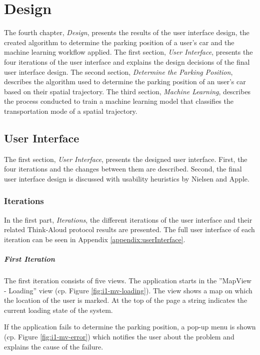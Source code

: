 \chapter{Design}
The fourth chapter, \textit{Design}, presents the results of the user interface design, the created algorithm to determine the parking position of a user's car and the machine learning workflow applied. The first section, \textit{User Interface}, presents the four iterations of the user interface and explains the design decisions of the final user interface design. The second section, \textit{Determine the Parking Position}, describes the algorithm used to determine the parking position of an user's car based on their spatial trajectory. The third section, \textit{Machine Learning}, describes the process conducted to train a machine learning model that classifies the transportation mode of a spatial trajectory.

\section{User Interface}
The first section, \textit{User Interface}, presents the designed user interface. First, the four iterations and the changes between them are described. Second, the final user interface design is discussed with usability heuristics by Nielsen and Apple.

\subsection{Iterations}
In the first part, \textit{Iterations}, the different iterations of the user interface and their related Think-Aloud protocol results are presented. The full user interface of each iteration can be seen in Appendix \ref{appendix:userInterface}.

\paragraph{First Iteration}

The first iteration consists of five views. The application starts in the ''MapView - Loading'' view (cp. Figure \ref{fig:i1-mv-loading}). The view shows a map on which the location of the user is marked. At the top of the page a string indicates the current loading state of the system.

If the application fails to determine the parking position, a pop-up menu is shown (cp. Figure \ref{fig:i1-mv-error}) which notifies the user about the problem and explains the cause of the failure. 


